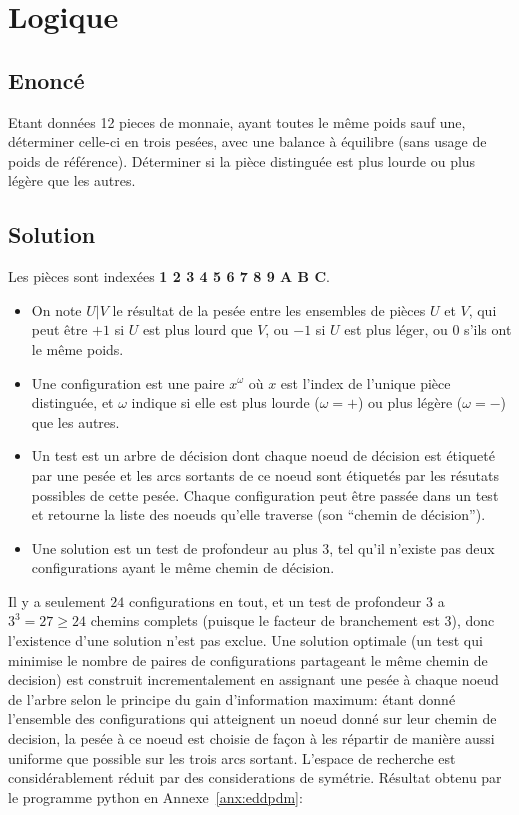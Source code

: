 \documentclass{article}
\newenvironment{statement}{\subsection{Enoncé}}{\pagebreak}
\newenvironment{solution}{\subsection{Solution}}{\pagebreak}
\begin{document}
\section{Logique}
\label{sec:eddpdm}
\begin{statement}
Etant données 12 pieces de monnaie, ayant toutes le même poids sauf une, déterminer celle-ci en trois pesées, avec une balance à équilibre (sans usage de poids de référence). Déterminer si la pièce distinguée est plus lourde ou plus légère que les autres.
\end{statement}
\begin{solution}
Les pièces sont indexées {\bf 1 2 3 4 5 6 7 8 9 A B C}.
\begin{itemize}
\item 
On note $U|V$ le résultat de la pesée entre les ensembles de pièces $U$ et $V$, qui peut être $+1$ si $U$ est plus lourd que $V$, ou $-1$ si $U$ est plus léger, ou $0$ s'ils ont le même poids.
\item 
Une configuration est une paire $x^\omega$ où $x$ est l'index de l'unique pièce distinguée, et $\omega$ indique si elle est plus lourde ($\omega=+$) ou plus légère ($\omega=-$) que les autres.
\item 
Un test est un arbre de décision dont chaque noeud de décision est étiqueté par une pesée et les arcs sortants de ce noeud sont étiquetés par les résutats possibles de cette pesée. Chaque configuration peut être passée dans un test et retourne la liste des noeuds qu'elle traverse (son ``chemin de décision'').
\item 
Une solution est un test de profondeur au plus $3$, tel qu'il n'existe pas deux configurations ayant le même chemin de décision.
\end{itemize}
Il y a seulement $24$ configurations en tout, et un test de profondeur $3$ a $3^3=27\geq24$ chemins complets (puisque le facteur de branchement est $3$), donc l'existence d'une solution n'est pas exclue. Une solution optimale (un test qui minimise le nombre de paires de configurations partageant le même chemin de decision) est construit incrementalement en assignant une pesée à chaque noeud de l'arbre selon le principe du gain d'information maximum: étant donné l'ensemble des configurations qui atteignent un noeud donné sur leur chemin de decision, la pesée à ce noeud est choisie de façon à les répartir de manière aussi uniforme que possible sur les trois arcs sortant. L'espace de recherche est considérablement réduit par des considerations de symétrie. Résultat obtenu par le programme python en Annexe~\ref{anx:eddpdm}:
\begin{center}
\begin{tikzpicture}[probe/.style={rectangle,rounded corners,draw},sol/.style={blue},outcome/.style={pos=.7,fill=white}]


\end{tikzpicture}
\end{center}
\end{solution}
\end{document}
